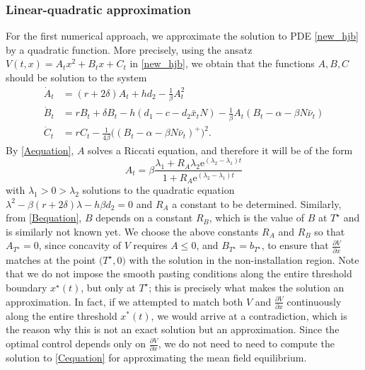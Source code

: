 \documentclass[12pt]{article}
\def\erm{\mathrm{e}}
\begin{document}
\subsubsection{Linear-quadratic approximation }\label{two_piece}

For the first numerical approach, we approximate the solution to PDE \eqref{new_hjb} by a quadratic function. More precisely, using the ansatz $V(t,x)= A_tx^2+B_tx+C_t$ in \eqref{new_hjb}, we obtain that the functions $A,B,C$ should be solution to the system 
\begin{subequations}\label{ODE_installation}
\begin{align}
\dot{A}_t &= (r+2\delta)A_t + hd_2 - \frac{1}{\beta} A_t^2 \label{Aequation} \\
\dot{B}_t &= rB_t + \delta B_t - h(d_1-c-d_2\bar{x}_tN) - \frac{1}{\beta} A_t(B_t-\alpha-\beta N\bar{\nu}_t) \label{Bequation}\\
\dot{C}_t &= rC_t - \frac{1}{4\beta} \big( (B_t-\alpha-\beta N\bar\nu_t)^+ \big)^2.\label{Cequation}
\end{align} 
\end{subequations}
By \eqref{Aequation}, \(A\) solves a Riccati equation, and therefore it will be of the form
\[
{A_t = \beta  \frac{\lambda_1 + R_A \lambda_2  \erm^{(\lambda_2 - \lambda_1)t}}{1 + R_A  \erm^{(\lambda_2 - \lambda_1)t}}}
\]
with $\lambda_1>0>\lambda_2$ solutions to the quadratic equation $\lambda^2- \beta (r+2\delta)\lambda-h \beta d_2=0$ and $R_A$ a constant to be determined. Similarly, from \eqref{Bequation}, $B$ depends on a constant $R_B$, which is the value of $B$ at $T^\star$ and is similarly not known yet. We choose the above constants $R_A$ and $R_B$ so that \(A_{T^\star} = 0\), since concavity of \(V\) requires \(A \leq 0\), and \(B_{T^\star} = b_{T^\star}\), to ensure that \(\frac{\partial V}{\partial x}\) matches at the point \(\bigl(T^\star,0\bigr)\) with the solution in the non-installation region. Note that we do not impose the smooth pasting conditions along the entire threshold boundary \(x^\star(t)\), but only at \(T^\star\); this is precisely what makes the solution an approximation. In fact, if we attempted to match both $V$ and $\frac{\partial V}{\partial x}$ continuously along the entire threshold $x^*(t)$, we would arrive at a contradiction, which is the reason why this is not an exact solution but an approximation.
Since the optimal control depends only on \(\frac{\partial V}{\partial x}\), we do not need to need to compute the solution to \eqref{Cequation} for approximating the mean field equilibrium.
\end{document}

